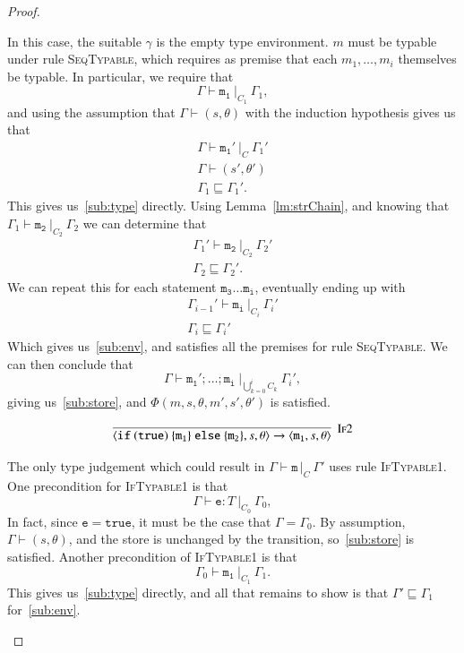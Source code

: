 \documentclass[12pt,a4paper,twoside,openright]{report}
\theoremstyle{definition}
\theoremstyle{dotless}
\newcommand{\typable}[2][ ]{\Gamma{}\vdash\mathtt{#2}\, |_C#1\:\Gamma#1'}
\newcommand{\transition}[6]{\langle{}\mathtt{#1},#2,#3\rangle{}\rightarrow{}\langle{}\mathtt{#4},#5,#6\rangle}
\begin{document}
\begin{proof}
\begin{case}[Seq2]
	In this case, the suitable $\gamma$ is the empty type environment. $m$ must
	be typable under rule \textsc{SeqTypable}, which requires as premise that
	each $m_1, \dots, m_i$ themselves be typable. In particular, we
	require that 
	$$\Gamma\vdash\mathtt{m_1}\ |_{C_1}\ \Gamma_1,$$ 
	and using the assumption that $\Gamma\vdash(s,\theta)$ with the induction hypothesis gives us that
	\begin{gather*}
	\Gamma\vdash\mathtt{m_1'}\ |_{C}\ \Gamma_1' \\
	\Gamma\vdash(s',\theta') \\
	\Gamma_1\sqsubseteq\Gamma_1'.
  \end{gather*}
  	This gives us~\eqref{sub:type} directly. Using
	Lemma~\ref{lm:strChain}, and knowing that $\Gamma_1\vdash\mathtt{m_2}\ |_{C_2}\ \Gamma_2$
   	we can determine that 
	\begin{gather*}
	  \Gamma_1'\vdash\mathtt{m_2}\ |_{C_2}\ \Gamma_2' \\
	  \Gamma_2\sqsubseteq\Gamma_2'.
  	\end{gather*}
	We can repeat this for each statement $\mathtt{m_3\dots m_i}$, eventually ending up with
	\begin{gather*}
		\Gamma_{i-1}'\vdash\mathtt{m_i}\ |_{C_i}\ \Gamma_i' \\
		\Gamma_i\sqsubseteq\Gamma_i'
	\end{gather*}
	Which gives us~\eqref{sub:env}, and satisfies all the premises for rule
	\textsc{SeqTypable}. We can then conclude that 
	$$\Gamma\vdash\mathtt{m_1'; \dots; m_i}\ |_{\bigcup_{k=0}^i{C_k}}\ \Gamma_i',$$
	giving us~\eqref{sub:store}, and $\Phi(m,s,\theta,m',s',\theta')$ is satisfied.
  
  \end{case}

  \begin{case}[If2]
	$$\infer[\textsc{If2}]{
	  \transition{if\ (true)\ \{m_1\}\ else\ \{m_2\}}{s}{\theta}{m_1}{s}{\theta}
	}{}$$

	 The only type judgement which could result in $\typable{m}$ uses rule
	\textsc{IfTypable1}. One precondition for \textsc{IfTypable1} is that
	$$\Gamma\vdash\mathtt{e}:T\ |_{C_0}\ \Gamma_0,$$ 
	In fact, since $\mathtt{e} = \mathtt{true}$, it must be the case that $\Gamma=\Gamma_0$.
	By assumption, $\Gamma\vdash(s,\theta)$, and the store is unchanged by the transition, so~\eqref{sub:store}
	is satisfied. Another precondition of \textsc{IfTypable1} is that 
	$$\Gamma_0\vdash\mathtt{m_1}\ |_{C_1}\ \Gamma_1.$$
	This gives us~\eqref{sub:type} directly, and all that remains to show is that $\Gamma'\sqsubseteq \Gamma_1$ for~\eqref{sub:env}.


\end{case}
\end{proof}
\end{document}
